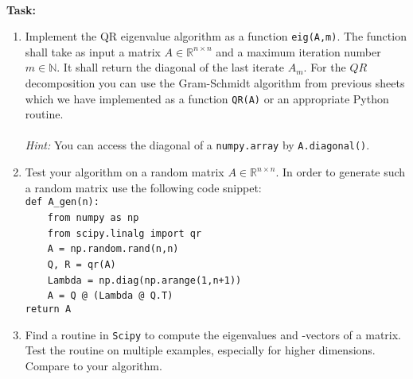 ~\\
\textbf{Task:}
\begin{enumerate}
	\item Implement the QR eigenvalue algorithm as a function \verb|eig(A,m)|. The function shall take as input a matrix $A\in \mathbb{R}^{n\times n}$ and a maximum iteration number $m\in\mathbb{N}$. It shall return the diagonal of the last iterate $A_m$. For the $QR$ decomposition you can use the Gram-Schmidt algorithm from previous sheets which we have implemented as a function \verb|QR(A)| or an appropriate Python routine. \\~\\
	\textit{Hint: } You can access the diagonal of a \verb|numpy.array| by \verb|A.diagonal()|.
	\item Test your algorithm on a random matrix $A\in \mathbb{R}^{n\times n}$. In order to generate such a random matrix use the following code snippet:\\[2pt]
		\verb|def A_gen(n): |\\
        \textcolor{white}{~~~~}\verb|from numpy as np|\\
        \textcolor{white}{~~~~}\verb|from scipy.linalg import qr|\\
        \textcolor{white}{~~~~}\verb|A = np.random.rand(n,n)|\\
		\textcolor{white}{~~~~}\verb|Q, R = qr(A)|\\
		\textcolor{white}{~~~~}\verb|Lambda = np.diag(np.arange(1,n+1))|\\
		\textcolor{white}{~~~~}\verb|A = Q @ (Lambda @ Q.T)|\\
		\verb|return A|
	\item Find a routine in \texttt{Scipy} to compute the eigenvalues and -vectors of a matrix. Test the routine on multiple examples, especially for higher dimensions. Compare to your algorithm.
	
\end{enumerate}






